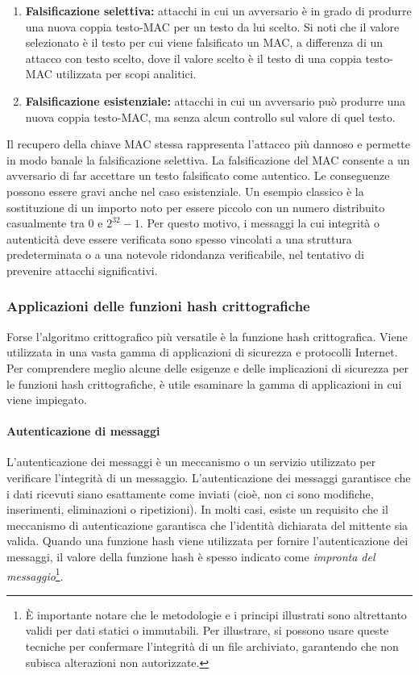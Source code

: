 \documentclass{article}
\theoremstyle{definition}
\begin{document}
\begin{enumerate}
    \item \textbf{Falsificazione selettiva:} attacchi in cui un avversario è in grado di produrre una nuova coppia testo-MAC per un testo da lui scelto. Si noti che il valore selezionato è il testo per cui viene falsificato un MAC, a differenza di un attacco con testo scelto, dove il valore scelto è il testo di una coppia testo-MAC utilizzata per scopi analitici.
    \item \textbf{Falsificazione esistenziale:} attacchi in cui un avversario può produrre una nuova coppia testo-MAC, ma senza alcun controllo sul valore di quel testo.
\end{enumerate}

Il recupero della chiave MAC stessa rappresenta l'attacco più dannoso e permette in modo banale la falsificazione selettiva. La falsificazione del MAC consente a un avversario di far accettare un testo falsificato come autentico. Le conseguenze possono essere gravi anche nel caso esistenziale. Un esempio classico è la sostituzione di un importo noto per essere piccolo con un numero distribuito casualmente tra 0 e \(2^{32} - 1\). Per questo motivo, i messaggi la cui integrità o autenticità deve essere verificata sono spesso vincolati a una struttura predeterminata o a una notevole ridondanza verificabile, nel tentativo di prevenire attacchi significativi.
\subsubsection{Applicazioni delle funzioni hash crittografiche}
Forse l'algoritmo crittografico più versatile è la funzione hash crittografica. Viene utilizzata in una vasta gamma di applicazioni di sicurezza e protocolli Internet.
Per comprendere meglio alcune delle esigenze e delle implicazioni di sicurezza per le funzioni hash crittografiche, è utile esaminare la gamma di applicazioni in cui viene impiegato.

\paragraph{Autenticazione di messaggi}
L'autenticazione dei messaggi è un meccanismo o un servizio utilizzato per verificare l'integrità di un messaggio. L'autenticazione dei messaggi garantisce che i dati ricevuti siano esattamente come inviati (cioè, non ci sono modifiche, inserimenti, eliminazioni o ripetizioni). In molti casi, esiste un requisito che il meccanismo di autenticazione garantisca che l'identità dichiarata del mittente sia valida. Quando una funzione hash viene utilizzata per fornire l'autenticazione dei messaggi, il valore della funzione hash è spesso indicato come \textit{impronta del messaggio}\footnote{È importante notare che le metodologie e i principi illustrati sono altrettanto validi per dati statici o immutabili. Per illustrare, si possono usare queste tecniche per confermare l'integrità di un file archiviato, garantendo che non subisca alterazioni non autorizzate.
}.
\end{document}
